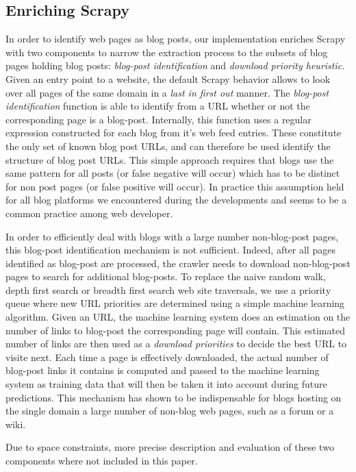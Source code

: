\subsection{Enriching Scrapy}
In order to identify web pages as blog posts, our implementation enriches Scrapy with two components to narrow the extraction process to the subsets of blog pages holding blog posts: \emph{blog-post identification} and \emph{download priority heuristic}. Given an entry point to a website, the default Scrapy behavior allows to look over all pages of the same domain in a \emph{last in first out} manner. The \emph{blog-post identification} function is able to identify from a URL whether or not the corresponding page is a blog-post. Internally, this function uses a regular expression constructed for each blog from it's web feed entries. These constitute the only set of known blog post URLs, and can therefore be used identify the structure of blog post URLs. This simple approach requires that blogs use the same pattern for all posts (or false negative will occur) which has to be distinct for non post pages (or false positive will occur). In practice this assumption held for all blog platforms we encountered during the developments and seems to be a common practice among web developer.

In order to efficiently deal with blogs with a large number non-blog-post pages, this blog-post identification mechanism is not sufficient. Indeed, after all pages identified as blog-post are processed, the crawler needs to download non-blog-post pages to search for additional blog-posts. To replace the naive random walk, depth first search or breadth first search web site traversals, we use a priority queue where new URL priorities are determined using a simple machine learning algorithm. Given an URL, the machine learning system does an estimation on the number of links to blog-post the corresponding page will contain. This estimated number of links are then used as a \emph{download priorities} to decide the best URL to visite next. Each time a page is effectively downloaded, the actual number of blog-post links it contains is computed and passed to the machine learning system as training data that will then be taken it into account during future predictions. This mechanism has shown to be indispensable for blogs hosting on the single domain a large number of non-blog web pages, such as a forum or a wiki.

Due to space constraints, more precise description and evaluation of these two components where not included in this paper.


